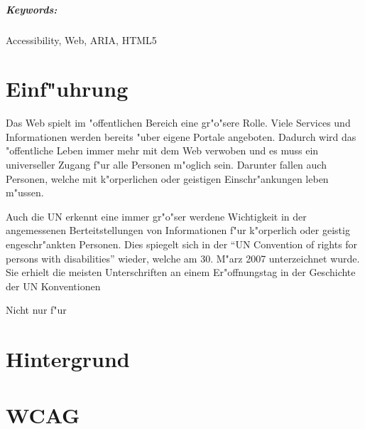 \documentclass[a4paper,bibtotoc,oneside]{scrbook}
\begin{document}
\paragraph*{Keywords:} Accessibility, Web, ARIA, HTML5
\newpage


\tableofcontents\thispagestyle{empty}
\newpage

\setcounter{page}{1}

\chapter[Erstes Kapitel]{Einf"uhrung}
Das Web spielt im "offentlichen Bereich eine gr"o"sere Rolle. Viele Services
und Informationen werden bereits "uber eigene Portale angeboten. Dadurch wird
das "offentliche Leben immer mehr mit dem Web verwoben und es muss ein
universeller Zugang f"ur alle Personen m"oglich sein. Darunter fallen auch
Personen, welche mit k"orperlichen oder geistigen Einschr"ankungen leben
m"ussen.

Auch die UN erkennt eine immer gr"o"ser werdene Wichtigkeit in der angemessenen
Berteitstellungen von Informationen f"ur k"orperlich oder geistig
engeschr"ankten Personen. Dies spiegelt sich in der "`UN Convention of rights
for persons with disabilities"' wieder, welche am 30. M"arz 2007 unterzeichnet
wurde. Sie erhielt die \glqq meisten Unterschriften an einem Er"offnungstag in
der Geschichte der UN Konventionen\grqq \cite{un_disabilities} 

Nicht nur f"ur  

\chapter[Zweites Kapitel]{Hintergrund}

\chapter[Zweites Kapitel]{WCAG}
\end{document}
